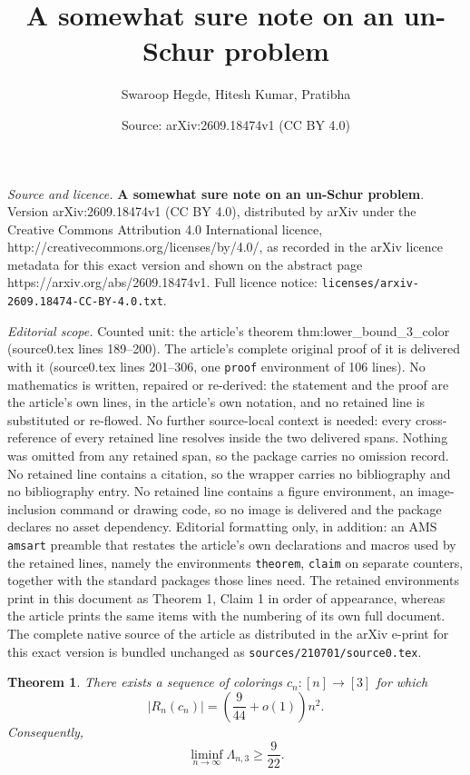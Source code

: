 \documentclass[10pt,a4paper]{amsart}
\title{\textbf{A somewhat sure note on an un-Schur problem}}
\author{Swaroop Hegde, Hitesh Kumar, Pratibha}
\date{Source: arXiv:2609.18474v1 (CC BY 4.0)}
\newtheorem{theorem}{Theorem}
\begin{document}
\maketitle

\noindent\emph{Source and licence.} \textbf{A somewhat sure note on an un-Schur problem}. Version arXiv:2609.18474v1 (CC BY 4.0), distributed by arXiv under the Creative Commons Attribution 4.0 International licence, http://creativecommons.org/licenses/by/4.0/, as recorded in the arXiv licence metadata for this exact version and shown on the abstract page https://arxiv.org/abs/2609.18474v1. Full licence notice: \texttt{licenses/arxiv-2609.18474-CC-BY-4.0.txt}.\par\smallskip

\noindent\textit{Editorial scope.} Counted unit: the article's theorem thm:lower\_bound\_3\_color (source0.tex lines 189--200). The article's complete original proof of it is delivered with it (source0.tex lines 201--306, one \texttt{proof} environment of 106 lines). No mathematics is written, repaired or re-derived: the statement and the proof are the article's own lines, in the article's own notation, and no retained line is substituted or re-flowed.  No further source-local context is needed: every cross-reference of every retained line resolves inside the two delivered spans.  Nothing was omitted from any retained span, so the package carries no omission record.  No retained line contains a citation, so the wrapper carries no bibliography and no bibliography entry.  No retained line contains a figure environment, an image-inclusion command or drawing code, so no image is delivered and the package declares no asset dependency.  Editorial formatting only, in addition: an AMS \texttt{amsart} preamble that restates the article's own declarations and macros used by the retained lines, namely the environments \texttt{theorem}, \texttt{claim} on separate counters, together with the standard packages those lines need.  The retained environments print in this document as Theorem 1, Claim 1 in order of appearance, whereas the article prints the same items with the numbering of its own full document.  The complete native source of the article as distributed in the arXiv e-print for this exact version is bundled unchanged as \texttt{sources/210701/source0.tex}.
\begin{theorem}\label{thm:lower_bound_3_color}
There exists a sequence of colorings $c_n:[n]\to [3]$ for which
\[
|R_n(c_n)|
=
\left(\frac{9}{44}+o(1)\right)n^2.
\]
Consequently,
\[
\liminf_{n\to \infty} \Lambda_{n,3}\ge \frac{9}{22}.
\]
\end{theorem}
\end{document}
